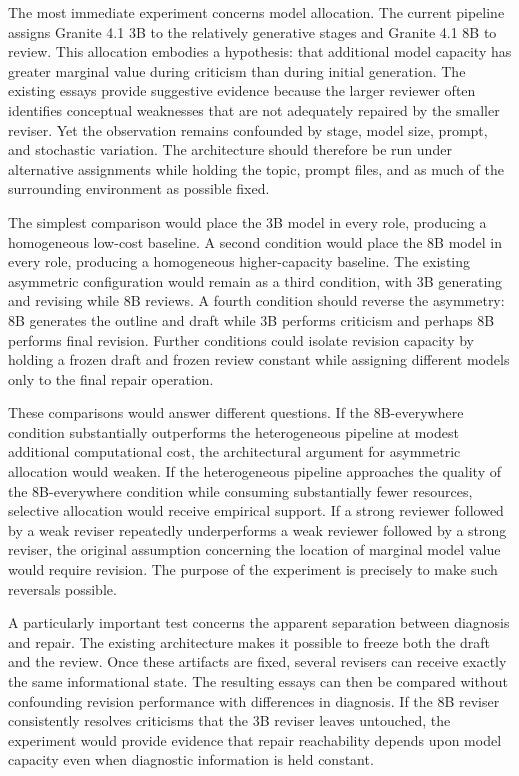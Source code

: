 \documentclass[11pt]{article}
\begin{document}
The most immediate experiment concerns model allocation. The current pipeline assigns Granite 4.1 3B to the relatively generative stages and Granite 4.1 8B to review. This allocation embodies a hypothesis: that additional model capacity has greater marginal value during criticism than during initial generation. The existing essays provide suggestive evidence because the larger reviewer often identifies conceptual weaknesses that are not adequately repaired by the smaller reviser. Yet the observation remains confounded by stage, model size, prompt, and stochastic variation. The architecture should therefore be run under alternative assignments while holding the topic, prompt files, and as much of the surrounding environment as possible fixed.

The simplest comparison would place the 3B model in every role, producing a homogeneous low-cost baseline. A second condition would place the 8B model in every role, producing a homogeneous higher-capacity baseline. The existing asymmetric configuration would remain as a third condition, with 3B generating and revising while 8B reviews. A fourth condition should reverse the asymmetry: 8B generates the outline and draft while 3B performs criticism and perhaps 8B performs final revision. Further conditions could isolate revision capacity by holding a frozen draft and frozen review constant while assigning different models only to the final repair operation.

These comparisons would answer different questions. If the 8B-everywhere condition substantially outperforms the heterogeneous pipeline at modest additional computational cost, the architectural argument for asymmetric allocation would weaken. If the heterogeneous pipeline approaches the quality of the 8B-everywhere condition while consuming substantially fewer resources, selective allocation would receive empirical support. If a strong reviewer followed by a weak reviser repeatedly underperforms a weak reviewer followed by a strong reviser, the original assumption concerning the location of marginal model value would require revision. The purpose of the experiment is precisely to make such reversals possible.

A particularly important test concerns the apparent separation between diagnosis and repair. The existing architecture makes it possible to freeze both the draft and the review. Once these artifacts are fixed, several revisers can receive exactly the same informational state. The resulting essays can then be compared without confounding revision performance with differences in diagnosis. If the 8B reviser consistently resolves criticisms that the 3B reviser leaves untouched, the experiment would provide evidence that repair reachability depends upon model capacity even when diagnostic information is held constant.
\end{document}
